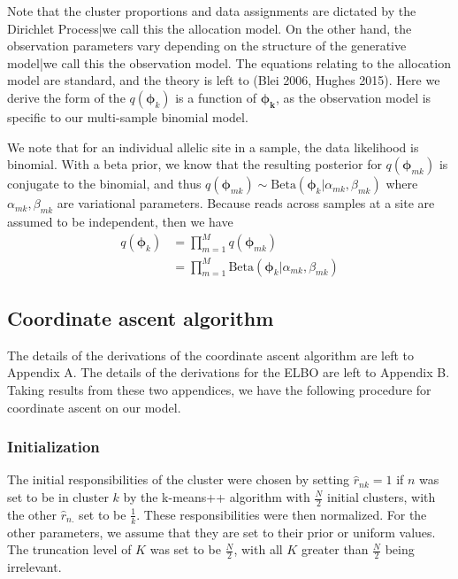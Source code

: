 \documentclass[11pt]{article}
\begin{document}
Note that the cluster proportions and data assignments are dictated by the Dirichlet Process|we call this the allocation model. On the other hand, the observation parameters vary depending on the structure of the generative model|we call this the observation model. The equations relating to the allocation model are standard, and the theory is left to (Blei 2006, Hughes 2015). Here we derive the form of the  $q(\bm{\phi}_k)$ is a function of $\bm{\phi_k}$, as the observation model is specific to our multi-sample binomial model.

We note that for an individual allelic site in a sample, the data likelihood is binomial. With a beta prior, we know that the resulting posterior for $q(\bm{\phi}_{mk})$ is conjugate to the binomial, and thus $q(\bm{\phi}_{mk}) \sim \mathrm{Beta}(\bm{\phi}_k | \alpha_{mk}, \beta_{mk})$ where $\alpha_{mk}, \beta_{mk}$ are variational parameters. Because reads across samples at a site are assumed to be independent, then we have 
\begin{align*}
q(\bm{\phi}_k)  &= \prod\limits_{m=1}^M q(\bm{\phi}_{mk}) \\
				&= \prod\limits_{m=1}^M \mathrm{Beta}(\bm{\phi}_k | \alpha_{mk}, \beta_{mk})
\end{align*}

\subsection{Coordinate ascent algorithm}

The details of the derivations of the coordinate ascent algorithm are left to Appendix A. The details of the derivations for the ELBO are left to Appendix B. Taking results from these two appendices, we have the following procedure for coordinate ascent on our model.

\subsubsection{Initialization}
The initial responsibilities of the cluster were chosen by setting $\hat{r}_{nk} = 1$ if $n$ was set to be in cluster $k$ by the k-means++ algorithm with $\frac{N}{2}$ initial clusters, with the other $\hat{r}_{n.}$ set to be $\frac{1}{k}$. These responsibilities were then normalized. For the other parameters, we assume that they are set to their prior or uniform values. The truncation level of $K$ was set to be $\frac{N}{2}$, with all $K$ greater than $\frac{N}{2}$ being irrelevant.
\end{document}
